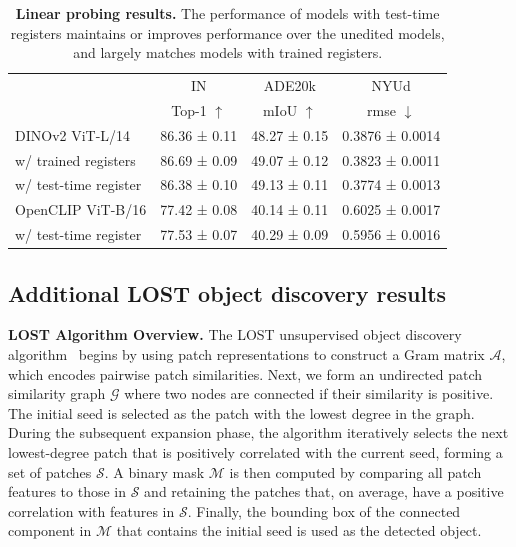\documentclass{article}
\begin{document}
\begin{table}[h]
  \centering
  \begin{minipage}[t]{1.0\textwidth}
    \centering
    \begin{tabular}{lccc}
      \toprule
                  & IN & ADE20k  & NYUd \\
                  & Top-1 $\uparrow$  & mIoU $\uparrow$  & rmse $\downarrow$ \\
                  \midrule
      DINOv2 ViT-L/14       & 86.36 ± 0.11 & 48.27 ± 0.15 & 0.3876 ± 0.0014 \\
      w/ trained registers  & 86.69 ± 0.09 & 49.07 ± 0.12 & 0.3823 ± 0.0011 \\
      w/ test-time register    & 86.38 ± 0.10 & 49.13 ± 0.11 & 0.3774 ± 0.0013 \\
      \midrule
      OpenCLIP ViT-B/16     & 77.42 ± 0.08  & 40.14 ± 0.11   & 0.6025 ± 0.0017   \\
      w/ test-time register & 77.53 ± 0.07    & 40.29 ± 0.09   & 0.5956 ± 0.0016    \\
      
      \bottomrule
    \end{tabular}\vspace{0.5em}
    \caption{\textbf{Linear probing results.} The performance of models with test-time registers maintains or improves performance over the unedited models, and largely matches models with trained registers.}
    \label{tab:extended_linear}
  \end{minipage}
  
  \vspace{-1.5em}
\end{table}



\subsection{Additional LOST object discovery results}
\label{appendix:more_LOST_results}

\textbf{LOST Algorithm Overview.}  The LOST unsupervised object discovery algorithm~\citep{lost} begins by using patch representations to construct a Gram matrix $\mathcal{A}$, which encodes pairwise patch similarities. Next, we form an undirected patch similarity graph $\mathcal{G}$ where two nodes are connected if their similarity is positive. The initial seed is selected as the patch with the lowest degree in the graph. During the subsequent expansion phase, the algorithm iteratively selects the next lowest-degree patch that is positively correlated with the current seed, forming a set of patches $\mathcal{S}$. A binary mask $\mathcal{M}$ is then computed by comparing all patch features to those in $\mathcal{S}$ and retaining the patches that, on average, have a positive correlation with features in $\mathcal{S}$. Finally, the bounding box of the connected component in $\mathcal{M}$ that contains the initial seed is used as the detected object.
\end{document}
